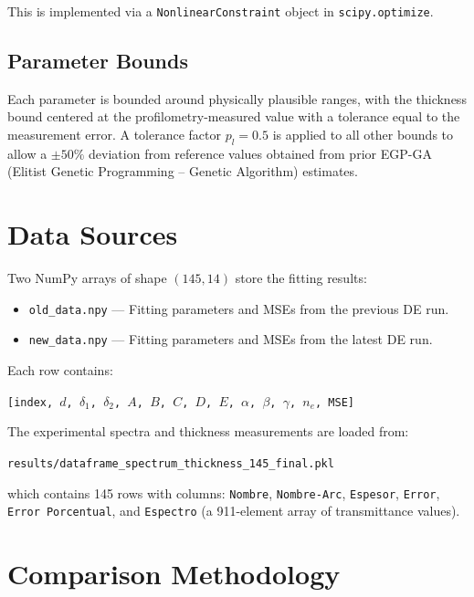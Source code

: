 \documentclass[12pt,a4paper]{article}
\begin{document}
This is implemented via a \texttt{NonlinearConstraint} object in \texttt{scipy.optimize}.

\subsection{Parameter Bounds}

Each parameter is bounded around physically plausible ranges, with the thickness bound centered at the profilometry-measured value with a tolerance equal to the measurement error. A tolerance factor $p_l = 0.5$ is applied to all other bounds to allow a $\pm 50\%$ deviation from reference values obtained from prior EGP-GA (Elitist Genetic Programming -- Genetic Algorithm) estimates.

\section{Data Sources}

Two NumPy arrays of shape $(145, 14)$ store the fitting results:

\begin{itemize}[noitemsep]
    \item \texttt{old\_data.npy} --- Fitting parameters and MSEs from the previous DE run.
    \item \texttt{new\_data.npy} --- Fitting parameters and MSEs from the latest DE run.
\end{itemize}

Each row contains:

\begin{center}
\texttt{[index, $d$, $\delta_1$, $\delta_2$, $A$, $B$, $C$, $D$, $E$, $\alpha$, $\beta$, $\gamma$, $n_e$, MSE]}
\end{center}

The experimental spectra and thickness measurements are loaded from:

\begin{center}
\texttt{results/dataframe\_spectrum\_thickness\_145\_final.pkl}
\end{center}

which contains 145 rows with columns: \texttt{Nombre}, \texttt{Nombre-Arc}, \texttt{Espesor}, \texttt{Error}, \texttt{Error Porcentual}, and \texttt{Espectro} (a 911-element array of transmittance values).

\section{Comparison Methodology}
\end{document}
